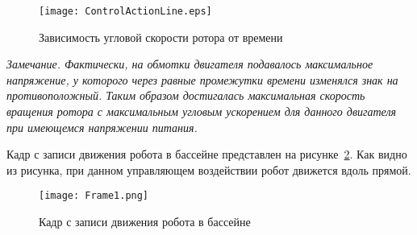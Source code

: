 
\begin{figure}[!ht]
	\centering
	\texttt{[image: ControlActionLine.eps]}
	\caption{Зависимость угловой скорости ротора от времени}
	\label{ControlActionLine}
\end{figure}

%	
%	
%	
%	
%	

\textit{Замечание. Фактически, на обмотки двигателя подавалось максимальное напряжение, у которого через равные промежутки времени изменялся знак на противоположный. Таким образом достигалась максимальная скорость вращения ротора с максимальным угловым ускорением для данного двигателя при имеющемся напряжении питания.}

Кадр с записи движения робота в бассейне представлен на рисунке~\ref{Frame1}. Как видно из рисунка, при данном управляющем воздействии робот движется вдоль прямой.

\begin{figure}[!ht]
	\centering
	\texttt{[image: Frame1.png]}
	\caption{Кадр с записи движения робота в бассейне}
	\label{Frame1}
\end{figure}

%	
%	





